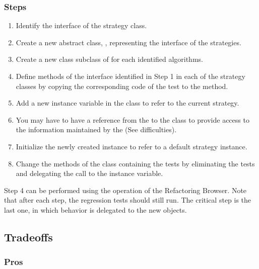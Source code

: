 \documentclass[a4paper,10pt,twoside]{book}
\begin{document}
\subsubsection*{Steps}
\begin{enumerate}
  \item Identify the interface of the strategy class.

  \item Create a new abstract class, , representing the interface of the strategies.

  \item Create a new class subclass of  for each identified algorithms.

  \item Define methods of the interface identified in Step 1 in each of the strategy classes by copying the corresponding code of the test to the method. 

  \item Add a new instance variable in the  class to refer to the current strategy.

  \item You may have to have a reference from the  to the  class to provide access to the information maintained by the  (See difficulties).

  \item Initialize the newly created instance to refer to a default strategy instance.

  \item Change the methods of the  class containing the tests by eliminating the tests and delegating the call to the instance variable.
\end{enumerate}

Step 4 can be performed using the  operation of the Refactoring Browser. Note that after each step, the regression tests should still run. The critical step is the last one, in which behavior is delegated to the new  objects.

\subsection*{Tradeoffs}

\subsubsection*{Pros}
\end{document}
